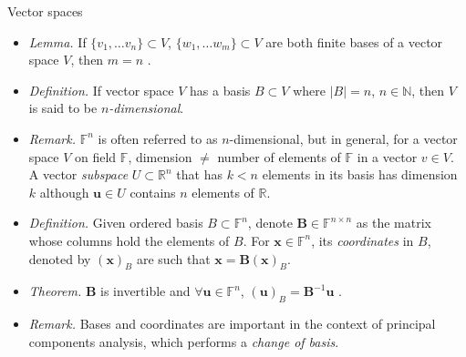 \documentclass{beamer}
\numberwithin{equation}{section}
\begin{document}
\begin{frame}{Vector spaces}
    \begin{itemize}
        \item
        \textit{Lemma.} If $ \{v_1, \ldots v_n\} \subset V $,
        $ \{w_1, \ldots w_m\} \subset V $ are both finite bases of a vector
        space $ V $, then $ m = n $ \cite{jacob_linalg}.

        \item
        \textit{Definition.} If vector space $ V $ has a basis $ B \subset V $
        where $ |B| = n $, $ n \in \mathbb{N} $, then $ V $ is said to be
        $ n $\textit{-dimensional}.

        \item
        \textit{Remark.} $ \mathbb{F}^n $ is often referred to as
        $ n $-dimensional, but in general, for a vector space $ V $ on field
        $ \mathbb{F} $, dimension $ \ne $ number of elements of $ \mathbb{F} $
        in a vector $ v \in V $. A vector \textit{subspace} $ U \subset
        \mathbb{R}^n $ that has $ k < n $ elements in its basis has dimension
        $ k $ although $ \mathbf{u} \in U $ contains $ n $ elements of
        $ \mathbb{R} $.

        \item
        \textit{Definition.} Given ordered basis $ B \subset \mathbb{F}^n $,
        denote $ \mathbf{B} \in \mathbb{F}^{n \times n} $ as the matrix whose
        columns hold the elements of $ B $. For $ \mathbf{x} \in
        \mathbb{F}^n $, its \textit{coordinates} in $ B $, denoted by
        $ (\mathbf{x})_B $ are such that
        $ \mathbf{x} = \mathbf{B}(\mathbf{x})_B $.

        \item
        \textit{Theorem.} $ \mathbf{B} $ is invertible and
        $ \forall \mathbf{u} \in \mathbb{F}^n $,
        $ (\mathbf{u})_B = \mathbf{B}^{-1}\mathbf{u} $ \cite{jacob_linalg}.

        \item
        \textit{Remark.} Bases and coordinates are important in the context of
        principal components analysis, which performs a \textit{change of
        basis}.
    \end{itemize}
\end{frame}
\end{document}
